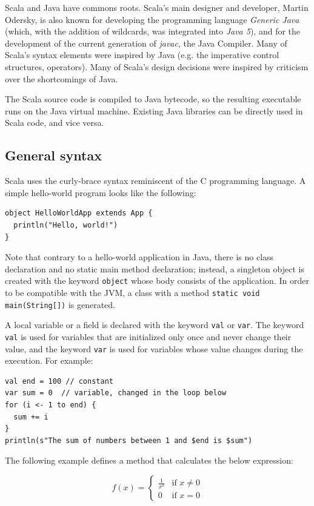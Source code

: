 Scala and Java have commons roots. Scala's main designer and developer, Martin Odersky, is also known for developing the programming language \emph{Generic Java} (which, with the addition of wildcards, was integrated into \emph{Java 5}), and for the development of the current generation of \emph{javac}, the Java Compiler. Many of Scala's syntax elements were inspired by Java (e.g. the imperative control structures, operators). Many of Scala's design decisions were inspired by criticism over the shortcomings of Java.

The Scala source code is compiled to Java bytecode, so the resulting executable runs on the Java virtual machine. Existing Java libraries can be directly used in Scala code, and vice versa. 

\subsection{General syntax}

Scala uses the curly-brace syntax reminiscent of the C programming language. A simple hello-world program looks like the following:

\begin{lstlisting}
object HelloWorldApp extends App {
  println("Hello, world!")
}
\end{lstlisting}

Note that contrary to a hello-world application in Java, there is no class declaration and no static main method declaration; instead, a singleton object is created with the keyword \texttt{object} whose body consists of the application. In order to be compatible with the JVM, a class with a method \texttt{static void main(String[])} is generated.

A local variable or a field is declared with the keyword \texttt{val} or \texttt{var}. The keyword \texttt{val} is used for variables that are initialized only once and never change their value, and the keyword \texttt{var} is used for variables whose value changes during the execution. For example:

\begin{lstlisting}
val end = 100 // constant
var sum = 0  // variable, changed in the loop below
for (i <- 1 to end) {
  sum += i
}
println(s"The sum of numbers between 1 and $end is $sum")
\end{lstlisting}

The following example defines a method that calculates the below expression:

\[
f(x) = 
  \begin{cases}
    \frac{1}{x^2} & \text{if } x \neq 0 \\
    0 & \text{if } x = 0
  \end{cases}
\]

